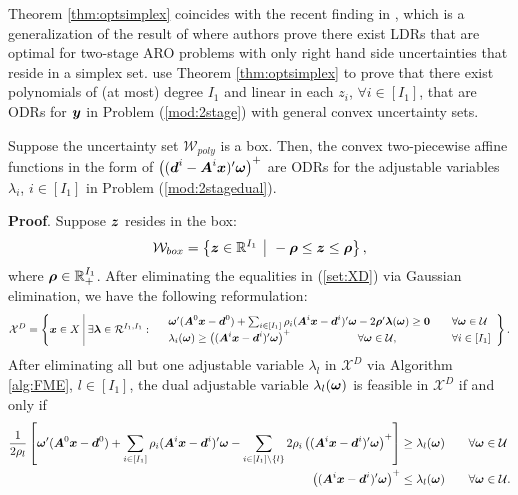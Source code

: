 \documentclass[fleqn,isre,blindrev]{informs4}
\newcommand{\mb}[1]{\mbox{\boldmath \ensuremath{#1}}}
\begin{document}
	 {Theorem \ref{thm:optsimplex} coincides with the recent finding in \cite[Corollary 2]{bwoz16}}, which is a generalization of the result of \cite[Theorem 1]{bg12} where authors prove there exist  LDRs that are optimal for two-stage ARO problems with only right hand side uncertainties that reside in a simplex set.  {\cite{zd17b} use Theorem \ref{thm:optsimplex} to prove that there exist polynomials of (at most) degree $I_1$ and linear in each $z_i$, $\forall i \in [I_1]$, that are ODRs for $\mb{y}$ in Problem (\ref{mod:2stage}) with general convex uncertainty sets.}
	
	
	\begin{theorem} \label{thm:optbox}
		Suppose the uncertainty set $\mathcal{W}_{poly}$ is a box. Then, the convex two-piecewise affine functions in the form of $\left((\mb{d}^i- \mb{A}^i\mb{x})'\mb{\omega}\right)^+$ are ODRs for the adjustable variables $\lambda_i$, $i\in [I_1]$ in Problem (\ref{mod:2stagedual}).
	\end{theorem}
	\textbf{Proof}. Suppose $\mb{z}$ resides in the box:
\begin{equation*}
	\mathcal{W}_{box} = \left\{ \mb{z}\in \mathbb{R}^{I_1} \enskip \vline  \enskip -\mb{\rho} \le \mb{z} \le \mb{\rho} \right\},  
\end{equation*}
	where $\mb{\rho} \in \mathbb{R}^{I_1}_{+}$.  After eliminating the equalities in (\ref{set:XD}) via Gaussian elimination, we have the following reformulation:
\begin{equation}\label{set:Xbox}
		\mathcal{X}^D=  \left\{ \mb{x} \in X \,\, \vline \,\,
		\exists \mb{\lambda} \in \mathcal{R}^{I_1,I_1}: \begin{array}{lll}
			&  \mb{\omega}' (\mb{A}^0\mb{x}-\mb{d}^0) + \sum_{i\in [I_1]} \rho_i (\mb{A}^i\mb{x}-\mb{d}^i)'\mb{\omega}- 2\mb{\rho}'\mb{\lambda}(\mb{\omega}) \ge \mb{0}  \quad & \forall \mb{\omega} \in \mathcal{U} \\
			&\lambda_i(\mb{\omega}) \ge \left((\mb{A}^i\mb{x}- \mb{d}^i)'\mb{\omega}\right)^+   \qquad   \qquad  \qquad \forall \mb{\omega} \in \mathcal{U},  \enskip &\forall i\in [I_1] 
		\end{array}
		\right\}.
\end{equation}
	After eliminating all but one adjustable variable $\lambda_l$ in $\mathcal{X}^D$ via Algorithm \ref{alg:FME}, $l \in [I_1]$,  the dual adjustable variable $\lambda_l(\mb{\omega})$ is feasible in $\mathcal{X}^D$ if and only if 
\begin{align*}
		 \frac{1}{2\rho_l} \left[\mb{\omega}' (\mb{A}^0\mb{x}-\mb{d}^0) + \sum_{i\in [I_1]} \rho_i (\mb{A}^i\mb{x}-\mb{d}^i )'\mb{\omega} - \sum_{i \in [I_1]\setminus\{l\}}  2\rho_i\left((\mb{A}^i\mb{x}- \mb{d}^i)'\mb{\omega}\right)^+ \right] &\ge  \lambda_l(\mb{\omega}) \qquad  \forall \mb{\omega} \in \mathcal{U}\\
		   \left((\mb{A}^i\mb{x}- \mb{d}^i)'\mb{\omega}\right)^+ &\le \lambda_l(\mb{\omega}) \qquad  \forall \mb{\omega} \in \mathcal{U}.
\end{align*}
\end{document}
